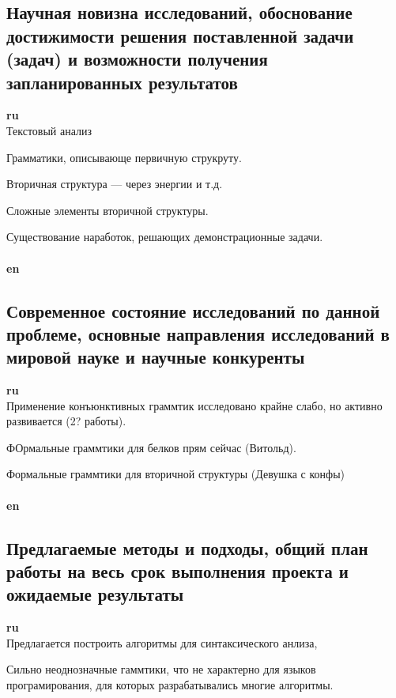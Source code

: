 \documentclass[12pt]{article}  %
\theoremstyle{remark}
\begin{document}
\subsection{Научная новизна исследований, обоснование достижимости решения поставленной задачи (задач) и возможности получения запланированных результатов}

\textbf{ru}\\
Текстовый анализ

Грамматики, описывающе первичную струкруту.

Вторичная структура --- через энергии и т.д.

Сложные элементы вторичной структуры.

Существование наработок, решающих демонстрационные задачи.
\\
\\
\textbf{en}\\


\subsection{Современное состояние исследований по данной проблеме, основные направления исследований в мировой науке и научные конкуренты}

\textbf{ru}\\
Применение конъюнктивных граммтик исследовано крайне слабо, но активно развивается (2? работы).

ФОрмальные граммтики для белков прям сейчас (Витольд).

Формальные граммтики для вторичной структуры (Девушка с конфы)
\\
\\
\textbf{en}\\



\subsection{Предлагаемые методы и подходы, общий план работы на весь срок выполнения проекта и ожидаемые результаты }

\textbf{ru}\\
Предлагается построить алгоритмы для синтаксического анлиза,

Сильно неоднозначные гаммтики, что не характерно для языков програмирования, для которых разрабатывались многие алгоритмы.
\end{document}

